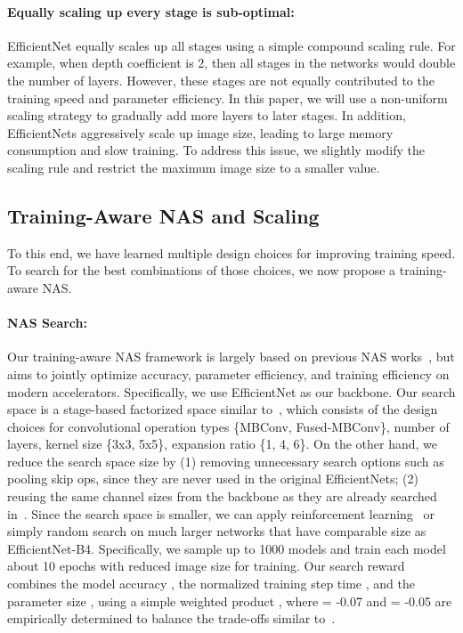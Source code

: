 \documentclass{article}
\begin{document}
\paragraph{Equally scaling up every stage is sub-optimal:} 
EfficientNet equally scales up all stages using a simple compound scaling rule. For example, when depth coefficient is 2, then all stages in the networks would double the number of layers. However, these stages are not equally contributed to the training speed and parameter efficiency. In this paper, we will use a non-uniform scaling strategy to gradually add more layers to later stages. In addition, EfficientNets aggressively scale up image size, leading to large memory consumption and slow training. To address this issue, we slightly modify the scaling rule and restrict the maximum image size to a smaller value.


\subsection{Training-Aware NAS and Scaling}

To this end, we have learned multiple design choices for improving training speed. To search for the best combinations of those choices, we now propose a training-aware NAS.

\paragraph{NAS Search:} Our training-aware NAS framework is largely based on previous NAS works~\cite{mnas19,efficientnet19}, but aims to jointly optimize accuracy, parameter efficiency, and training efficiency on modern accelerators. Specifically, we use EfficientNet as our backbone. Our search space is a stage-based factorized space similar to~\cite{mnas19}, which consists of the design choices for convolutional operation types \{MBConv, Fused-MBConv\}, number of layers, kernel size \{3x3, 5x5\}, expansion ratio \{1, 4, 6\}. On the other hand, we reduce the search space size by (1) removing unnecessary search options such as pooling skip ops, since they are never used in the original EfficientNets; (2) reusing the same channel sizes from the backbone as they are already searched in~\cite{efficientnet19}. Since the search space is smaller, we can apply reinforcement learning~\cite{mnas19} or simply random search on much larger networks that have comparable size as EfficientNet-B4. Specifically, we sample up to 1000 models and train each model about 10 epochs with reduced image size for training. Our search reward combines the model accuracy , the normalized training step time , and the parameter size , using a simple weighted product ,  where  = -0.07 and  = -0.05 are empirically determined to balance the trade-offs similar to~\cite{mnas19}.
\end{document}
